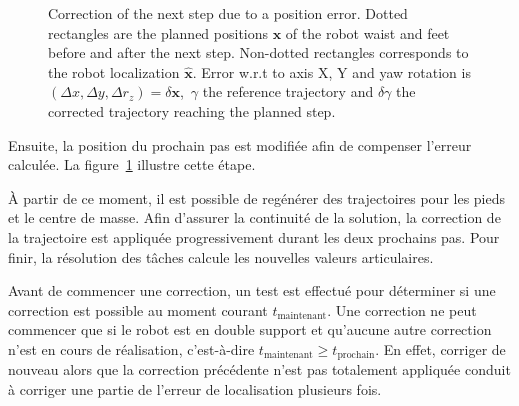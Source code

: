 \begin{figure}[ht!]
\begin{center}
  \end{center}
  \caption{Correction of the next step due to a position error. Dotted
    rectangles are the planned positions $\mathbf{x}$ of the robot
    waist and feet before and after the next step. Non-dotted
    rectangles corresponds to the robot localization
    $\mathbf{\hat{x}}$. Error w.r.t to axis X, Y and yaw rotation is
    \mbox{$(\Delta x, \Delta y, \Delta r_z) = \delta \mathbf{x}$,
      $\gamma$} the reference trajectory and $\delta \gamma$ the
    corrected trajectory reaching the planned
    step. \label{fig:footstepreplan}}
\end{figure}


Ensuite, la position du prochain pas est modifiée afin de compenser
l'erreur calculée. La figure \ref{fig:footstepreplan} illustre cette étape.


À partir de ce moment, il est possible de regénérer des trajectoires
pour les pieds et le centre de masse. Afin d'assurer la continuité de
la solution, la correction de la trajectoire est appliquée
progressivement durant les deux prochains pas. Pour finir, la
résolution des tâches calcule les nouvelles valeurs articulaires.


Avant de commencer une correction, un test est effectué pour
déterminer si une correction est possible au moment courant
$t_{\text{maintenant}}$. Une correction ne peut commencer que si le
robot est en double support et qu'aucune autre correction n'est en
cours de réalisation, c'est-à-dire \mbox{$t_{\text{maintenant}} \geq
  t_{\text{prochain}}$}. En effet, corriger de nouveau alors que la
correction précédente n'est pas totalement appliquée conduit à
corriger une partie de l'erreur de localisation plusieurs fois.


